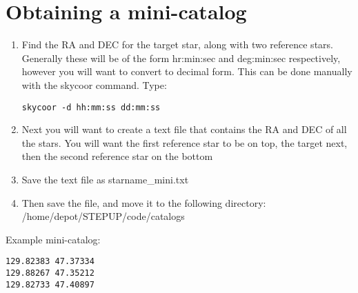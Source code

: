 \documentclass[10pt,preprint]{article}
\begin{document}
\section{Obtaining a mini-catalog}
\begin{enumerate}
\item Find the RA and DEC for the target star, along with two reference stars. Generally these will be of the form hr:min:sec and deg:min:sec respectively, however you will want to convert to decimal form. This can be done manually with the skycoor command. Type:
\begin{verbatim}
skycoor -d hh:mm:ss dd:mm:ss
\end{verbatim}
\item Next you will want to create a text file that contains the RA and DEC of all the stars. You will want the first reference star to be on top, the target next, then the second reference star on the bottom
\item Save the text file as starname\_mini.txt
\item Then save the file, and move it to the following directory: /home/depot/STEPUP/code/catalogs
\end{enumerate}

\noindent Example mini-catalog:
\begin{verbatim}
129.82383 47.37334
129.88267 47.35212
129.82733 47.40897
\end{verbatim}
\end{document}
